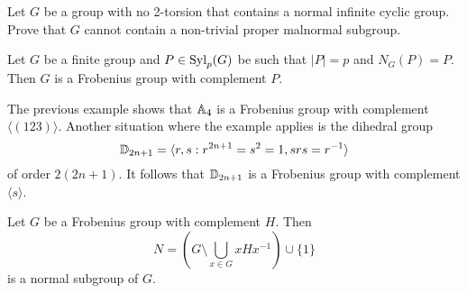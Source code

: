 \begin{bonus}
\label{xca:malnormal_no2torsion}
    Let $G$ be a group with no 2-torsion 
    that contains a normal infinite cyclic group. Prove 
    that $G$ cannot contain a non-trivial proper malnormal subgroup. 
\end{bonus}


\begin{example}
    Let $G$ be a finite group 
    and $P\in\mathrm{Syl}_p(G)$ be such that $|P|=p$ and $N_G(P)=P$. Then $G$ is a Frobenius group
    with complement $P$. 
\end{example}

The previous example shows that 
$\mathbb{A}_4$ is a Frobenius group
with complement $\langle(123)\rangle$. Another situation
where the example applies is the dihedral
group 
\[
\mathbb{D}_{2n+1}=\langle r,s:r^{2n+1}=s^2=1,srs=r^{-1}\rangle
\]
of order $2(2n+1)$. It follows that
$\mathbb{D}_{2n+1}$ is a Frobenius
group with complement $\langle s\rangle$. 

\begin{theorem}[Frobenius]
  \label{thm:Frobenius}
  Let $G$ be a Frobenius group with complement $H$. Then
  \[
	N=\left( G\setminus\bigcup_{x\in G}xHx^{-1}\right)\cup\{1\}
  \]
  is a normal subgroup of $G$.
\end{theorem}

